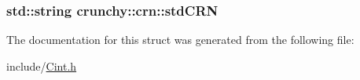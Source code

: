 \subsubsection[{std\+C\+R\+N}]{\setlength{\rightskip}{0pt plus 5cm}std\+::string crunchy\+::crn\+::std\+C\+R\+N\hspace{0.3cm}{\ttfamily [static]}}\label{structcrunchy_1_1crn_ae5f71a10acf2431498d683fee28851db}


The documentation for this struct was generated from the following file\+:\begin{DoxyCompactItemize}
\item 
include/\hyperlink{_cint_8h}{Cint.\+h}\end{DoxyCompactItemize}
